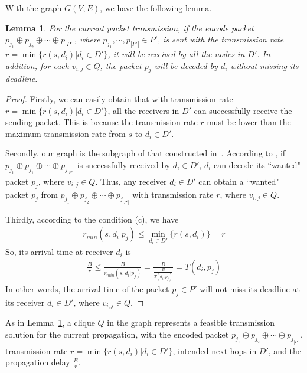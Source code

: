 \documentclass[journal]{IEEEtran}
\newtheorem{lemma}{\textbf{Lemma}}
\begin{document}
With the graph $G(V,E)$, we have the following lemma.
\vspace{-0.02in}\begin{lemma}\vspace{-0.1in}\label{lemma_graph}
For the current packet transmission, if the encode packet $p_{j_1}\oplus p_{j_2}\oplus \cdots\oplus p_{|P'|}$, where $p_{j_1},\cdots,p_{|P'|} \in P'$, is sent with the transmission rate $r=\min\{r(s,d_i)|d_i\in D'\}$, it will be received by all the nodes in $D'$. In addition, for each $v_{i,j}\in Q$, the packet $p_j$ will be decoded by $d_i$ without missing its deadline.
\end{lemma}\vspace{-0.02in}
\begin{proof}
Firstly, we can easily obtain that with transmission rate $r=\min\{r(s,d_i)|d_i\in D'\}$, all the receivers in $D'$ can successfully receive the sending packet. This is because the transmission rate $r$ must be lower than the maximum transmission rate from $s$ to $d_i\in D'$.

Secondly, our graph is the subgraph of that constructed in~\cite{ZX2010Broadcast6}. According to \cite{ZX2010Broadcast6}, if $p_{j_1}\oplus p_{j_1}\oplus \cdots\oplus p_{j_{|P'|}}$ is successfully received by $d_i \in D'$, $d_i$ can decode its ``wanted" packet $p_j$, where $v_{i,j}\in Q$.
Thus, any receiver $d_i\in D'$ can obtain a ``wanted" packet $p_j$ from $p_{j_1}\oplus p_{j_2}\oplus \cdots\oplus p_{j_{|P'|}}$ with transmission rate $r$, where $v_{i,j}\in Q$.

Thirdly, according to the condition (c), we have
{\small\begin{eqnarray}
r_{min}(s,d_i|p_j)\leq \min_{d_i\in D'}\{r(s,d_i)\}=r
\end{eqnarray}}
So, its arrival time at receiver $d_i$ is
{\small\begin{eqnarray}
\frac{B}{r}\leq \frac{B}{r_{min}(s,d_i|p_j)}=\frac{B}{\frac{B}{T(d_i,p_j)}}=T(d_i,p_j)
\end{eqnarray}}
In other words, the arrival time of the packet $p_j\in P'$ will not miss its deadline at its receiver $d_i\in D'$, where $v_{i,j}\in Q$.
\end{proof}

As in Lemma~\ref{lemma_graph}, a clique $Q$ in the graph represents a feasible transmission solution for the current propagation, with the encoded packet $p_{j_1}\oplus p_{j_2}\oplus \cdots\oplus p_{j_{|P'|}}$, transmission rate $r=\min\{r(s,d_i)|d_i\in D'\}$, intended next hops in $D'$, and the propagation delay $\frac{B}{r}$.
\end{document}
